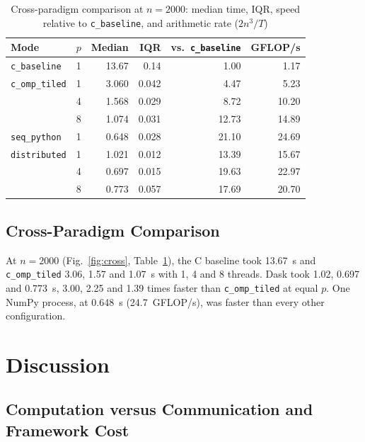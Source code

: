 \documentclass[conference,a4paper]{IEEEtran}
\newcommand{\code}[1]{\texttt{#1}}
\newcommand{\dist}{\code{distributed}}
\newcommand{\seqpy}{\code{seq\_python}}
\newcommand{\cseq}{\code{c\_baseline}}
\newcommand{\comp}{\code{c\_omp\_tiled}}
\begin{document}
\begin{table}[t]
  \centering
  \caption{Cross-paradigm comparison at $n = 2000$: median time, IQR, speed
           relative to \cseq{}, and arithmetic rate ($2n^3/T$)}
  \label{tab:cross}
  \footnotesize
  \setlength{\tabcolsep}{4.5pt}
  \begin{tabular}{@{}lrrrrr@{}}
    \toprule
    Mode & $p$ & Median & IQR & vs.\ \cseq & GFLOP/s \\
    \midrule
    \cseq  & 1 & 13.67 & 0.14  &  1.00 &  1.17 \\
    \comp  & 1 & 3.060 & 0.042 &  4.47 &  5.23 \\
           & 4 & 1.568 & 0.029 &  8.72 & 10.20 \\
           & 8 & 1.074 & 0.031 & 12.73 & 14.89 \\
    \seqpy & 1 & 0.648 & 0.028 & 21.10 & 24.69 \\
    \dist  & 1 & 1.021 & 0.012 & 13.39 & 15.67 \\
           & 4 & 0.697 & 0.015 & 19.63 & 22.97 \\
           & 8 & 0.773 & 0.057 & 17.69 & 20.70 \\
    \bottomrule
  \end{tabular}
\end{table}

\subsection{Cross-Paradigm Comparison}
\label{sec:res-cross}

At $n = 2000$ (Fig.~\ref{fig:cross}, Table~\ref{tab:cross}), the C baseline
took 13.67~s and \comp{} 3.06, 1.57 and 1.07~s with 1, 4 and 8 threads. Dask
took 1.02, 0.697 and 0.773~s, 3.00, 2.25 and 1.39 times faster than \comp{} at
equal $p$. One NumPy process, at 0.648~s (24.7~GFLOP/s), was faster than every
other configuration.

\section{Discussion}
\label{sec:discussion}

\subsection{Computation versus Communication and Framework Cost}
\label{sec:disc-overhead}
\end{document}
